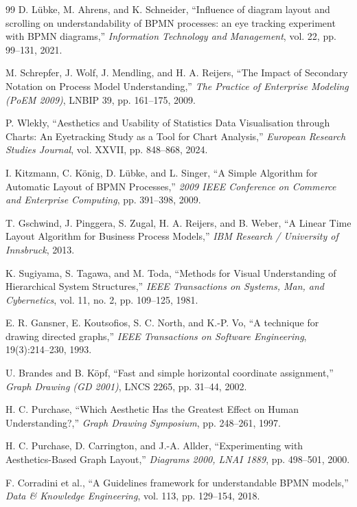 \documentclass{article}
\begin{document}
\begin{thebibliography}{99}
		D. L\"ubke, M. Ahrens, and K. Schneider, ``Influence of diagram layout and scrolling on understandability of BPMN processes: an eye tracking experiment with BPMN diagrams,'' \emph{Information Technology and Management}, vol. 22, pp. 99--131, 2021.
		
		M. Schrepfer, J. Wolf, J. Mendling, and H. A. Reijers, ``The Impact of Secondary Notation on Process Model Understanding,'' \emph{The Practice of Enterprise Modeling (PoEM 2009)}, LNBIP 39, pp. 161--175, 2009.
		
		P. Wlekły, ``Aesthetics and Usability of Statistics Data Visualisation through Charts: An Eyetracking Study as a Tool for Chart Analysis,'' \emph{European Research Studies Journal}, vol. XXVII, pp. 848--868, 2024.
		
		I. Kitzmann, C. K\"onig, D. L\"ubke, and L. Singer, ``A Simple Algorithm for Automatic Layout of BPMN Processes,'' \emph{2009 IEEE Conference on Commerce and Enterprise Computing}, pp. 391--398, 2009.
		
		T. Gschwind, J. Pinggera, S. Zugal, H. A. Reijers, and B. Weber, ``A Linear Time Layout Algorithm for Business Process Models,'' \emph{IBM Research / University of Innsbruck}, 2013.
		
		K. Sugiyama, S. Tagawa, and M. Toda, ``Methods for Visual Understanding of Hierarchical System Structures,'' \emph{IEEE Transactions on Systems, Man, and Cybernetics}, vol. 11, no. 2, pp. 109--125, 1981.
		
		E. R. Gansner, E. Koutsofios, S. C. North, and K.-P. Vo, ``A technique for drawing directed graphs,'' \emph{IEEE Transactions on Software Engineering}, 19(3):214--230, 1993.
		
		U. Brandes and B. K\"opf, ``Fast and simple horizontal coordinate assignment,'' \emph{Graph Drawing (GD 2001)}, LNCS 2265, pp. 31--44, 2002.
		
		H. C. Purchase, ``Which Aesthetic Has the Greatest Effect on Human Understanding?,'' \emph{Graph Drawing Symposium}, pp. 248--261, 1997.
		
		H. C. Purchase, D. Carrington, and J.-A. Allder, ``Experimenting with Aesthetics-Based Graph Layout,'' \emph{Diagrams 2000, LNAI 1889}, pp. 498--501, 2000.
		
		F. Corradini et al., ``A Guidelines framework for understandable BPMN models,'' \emph{Data \& Knowledge Engineering}, vol. 113, pp. 129--154, 2018.
		

\end{thebibliography}
\end{document}
